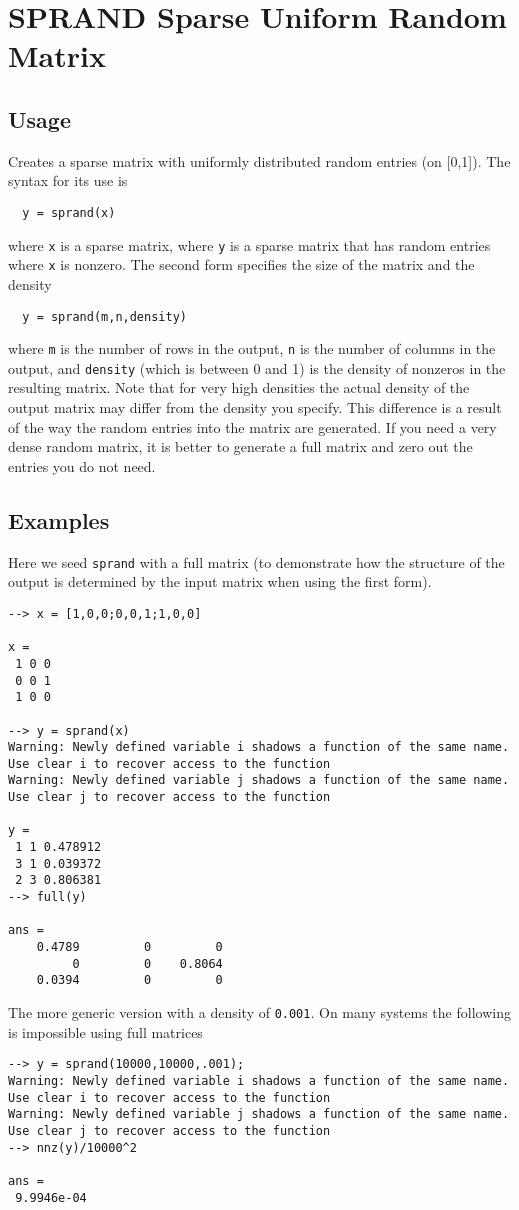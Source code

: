 \section{SPRAND Sparse Uniform Random Matrix}

\subsection{Usage}

Creates a sparse matrix with uniformly distributed random entries (on [0,1]).  The
syntax for its use is
\begin{verbatim}
  y = sprand(x)
\end{verbatim}
where \verb|x| is a sparse matrix, where \verb|y| is a sparse matrix that has
random entries where \verb|x| is nonzero.  The second form specifies the
size of the matrix and the density
\begin{verbatim}
  y = sprand(m,n,density)
\end{verbatim}
where \verb|m| is the number of rows in the output, \verb|n| is the number of 
columns in the output, and \verb|density| (which is between 0 and 1) is
the density of nonzeros in the resulting matrix.  Note that for very
high densities the actual density of the output matrix may differ from
the density you specify.  This difference is a result of the way the
random entries into the matrix are generated.  If you need a very dense
random matrix, it is better to generate a full matrix and zero out the 
entries you do not need.
\subsection{Examples}

Here we seed \verb|sprand| with a full matrix (to demonstrate how the structure
of the output is determined by the input matrix when using the first form).
\begin{verbatim}
--> x = [1,0,0;0,0,1;1,0,0]

x = 
 1 0 0 
 0 0 1 
 1 0 0 

--> y = sprand(x)
Warning: Newly defined variable i shadows a function of the same name.  Use clear i to recover access to the function
Warning: Newly defined variable j shadows a function of the same name.  Use clear j to recover access to the function

y = 
 1 1 0.478912
 3 1 0.039372
 2 3 0.806381
--> full(y)

ans = 
    0.4789         0         0 
         0         0    0.8064 
    0.0394         0         0 
\end{verbatim}
The more generic version with a density of \verb|0.001|.  On many systems the
following is impossible using full matrices
\begin{verbatim}
--> y = sprand(10000,10000,.001);
Warning: Newly defined variable i shadows a function of the same name.  Use clear i to recover access to the function
Warning: Newly defined variable j shadows a function of the same name.  Use clear j to recover access to the function
--> nnz(y)/10000^2

ans = 
 9.9946e-04 
\end{verbatim}
